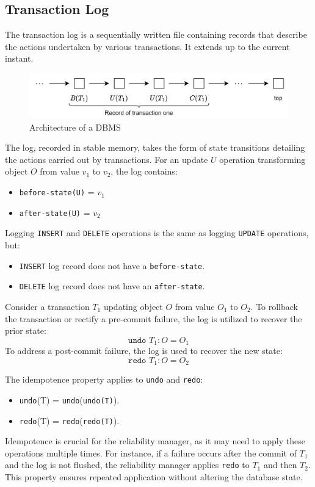 \subsection{Transaction Log}
The transaction log is a sequentially written file containing records that describe the actions undertaken by various transactions. 
It extends up to the current instant.
\begin{figure}[H]
    \centering
    \includegraphics[width=0.75\linewidth]{images/tl.png}
    \caption{Architecture of a DBMS}
\end{figure}
The log, recorded in stable memory, takes the form of state transitions detailing the actions carried out by transactions.
For an update $U$ operation transforming object $O$ from value $v_1$ to $v_2$, the log contains:
\begin{itemize}
    \item \texttt{before-state(U)} = $v_1$
    \item \texttt{after-state(U)} = $v_2$
\end{itemize}
Logging \texttt{INSERT} and \texttt{DELETE} operations is the same as logging \texttt{UPDATE} operations, but:
\begin{itemize}
    \item \texttt{INSERT} log record does not have a \texttt{before-state}.
    \item \texttt{DELETE} log record does not have an \texttt{after-state}.
\end{itemize}
\begin{example}
    Consider a transaction $T_1$ updating object $O$ from value $O_1$ to $O_2$.
    To rollback the transaction or rectify a pre-commit failure, the log is utilized to recover the prior state:
    \[\texttt{undo }T_1:O=O_1\]
    To address a post-commit failure, the log is used to recover the new state:
    \[\texttt{redo }T_1:O=O_2\]
\end{example}
The idempotence property applies to \texttt{undo} and \texttt{redo}: 
\begin{itemize}
    \item \texttt{undo}(T) = \texttt{undo}(\texttt{undo(T)}).
    \item \texttt{redo}(T) = \texttt{redo}(\texttt{redo(T)}).
\end{itemize}
Idempotence is crucial for the reliability manager, as it may need to apply these operations multiple times. 
For instance, if a failure occurs after the commit of $T_1$ and the log is not flushed, the reliability manager applies \texttt{redo} to $T_1$ and then $T_2$.
This property ensures repeated application without altering the database state.

